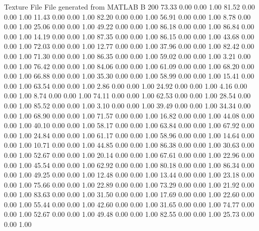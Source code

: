Texture File
File generated from MATLAB
B 200
   73.33   0.00   0.00   1.00
   81.52   0.00   0.00   1.00
   11.43   0.00   0.00   1.00
   82.20   0.00   0.00   1.00
   56.91   0.00   0.00   1.00
    8.78   0.00   0.00   1.00
   25.06   0.00   0.00   1.00
   49.22   0.00   0.00   1.00
   86.18   0.00   0.00   1.00
   86.84   0.00   0.00   1.00
   14.19   0.00   0.00   1.00
   87.35   0.00   0.00   1.00
   86.15   0.00   0.00   1.00
   43.68   0.00   0.00   1.00
   72.03   0.00   0.00   1.00
   12.77   0.00   0.00   1.00
   37.96   0.00   0.00   1.00
   82.42   0.00   0.00   1.00
   71.30   0.00   0.00   1.00
   86.35   0.00   0.00   1.00
   59.02   0.00   0.00   1.00
    3.21   0.00   0.00   1.00
   76.42   0.00   0.00   1.00
   84.06   0.00   0.00   1.00
   61.09   0.00   0.00   1.00
   68.20   0.00   0.00   1.00
   66.88   0.00   0.00   1.00
   35.30   0.00   0.00   1.00
   58.99   0.00   0.00   1.00
   15.41   0.00   0.00   1.00
   63.54   0.00   0.00   1.00
    2.86   0.00   0.00   1.00
   24.92   0.00   0.00   1.00
    4.16   0.00   0.00   1.00
    8.74   0.00   0.00   1.00
   74.11   0.00   0.00   1.00
   62.53   0.00   0.00   1.00
   28.54   0.00   0.00   1.00
   85.52   0.00   0.00   1.00
    3.10   0.00   0.00   1.00
   39.49   0.00   0.00   1.00
   34.34   0.00   0.00   1.00
   68.90   0.00   0.00   1.00
   71.57   0.00   0.00   1.00
   16.82   0.00   0.00   1.00
   44.08   0.00   0.00   1.00
   40.10   0.00   0.00   1.00
   58.17   0.00   0.00   1.00
   63.84   0.00   0.00   1.00
   67.92   0.00   0.00   1.00
   24.84   0.00   0.00   1.00
   61.17   0.00   0.00   1.00
   58.96   0.00   0.00   1.00
   14.64   0.00   0.00   1.00
   10.71   0.00   0.00   1.00
   44.85   0.00   0.00   1.00
   86.38   0.00   0.00   1.00
   30.63   0.00   0.00   1.00
   52.67   0.00   0.00   1.00
   20.14   0.00   0.00   1.00
   67.61   0.00   0.00   1.00
   22.96   0.00   0.00   1.00
   45.54   0.00   0.00   1.00
   62.92   0.00   0.00   1.00
   80.18   0.00   0.00   1.00
   86.34   0.00   0.00   1.00
   49.25   0.00   0.00   1.00
   12.48   0.00   0.00   1.00
   13.44   0.00   0.00   1.00
   23.18   0.00   0.00   1.00
   75.66   0.00   0.00   1.00
   22.89   0.00   0.00   1.00
   73.29   0.00   0.00   1.00
   21.92   0.00   0.00   1.00
   83.63   0.00   0.00   1.00
   31.50   0.00   0.00   1.00
   17.69   0.00   0.00   1.00
   22.60   0.00   0.00   1.00
   55.44   0.00   0.00   1.00
   42.60   0.00   0.00   1.00
   31.65   0.00   0.00   1.00
   74.77   0.00   0.00   1.00
   52.67   0.00   0.00   1.00
   49.48   0.00   0.00   1.00
   82.55   0.00   0.00   1.00
   25.73   0.00   0.00   1.00
